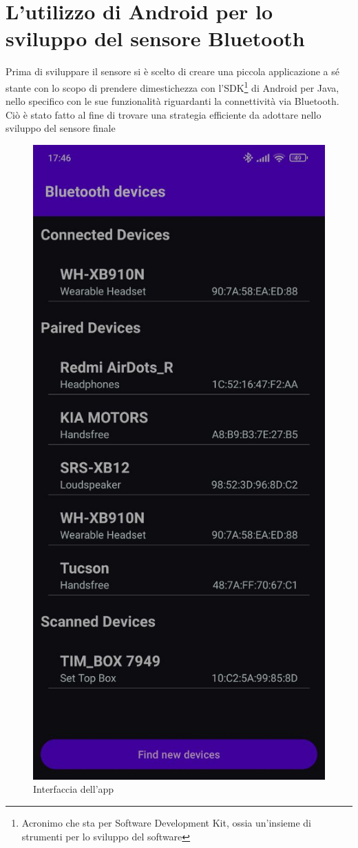 \chapter{L'utilizzo di Android per lo sviluppo del sensore Bluetooth}
\label{chap:app-separata}
Prima di sviluppare il sensore si è scelto di creare una piccola applicazione a sé stante con lo scopo di prendere dimestichezza con l'SDK\footnote{Acronimo che sta per Software Development Kit, ossia un'insieme di strumenti per lo sviluppo del software} di Android per Java, nello specifico con le sue funzionalità riguardanti la connettività via Bluetooth\cite{ref:bluetooth-doc}. Ciò è stato fatto al fine di trovare una strategia efficiente da adottare nello sviluppo del sensore finale
\begin{figure}
    \centering
    \includegraphics[width=0.9\linewidth]{images/separate_app.png}
    \caption{Interfaccia dell'app}
    \label{fig:separate_app}
\end{figure}

